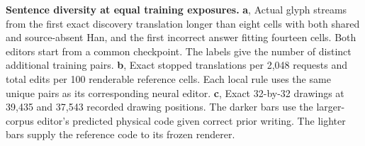 \textbf{Sentence diversity at equal training exposures.}
\textbf{a}, Actual glyph streams from the first exact discovery translation longer than eight cells with both shared and source-absent Han, and the first incorrect answer fitting fourteen cells. Both editors start from a common checkpoint. The labels give the number of distinct additional training pairs.
\textbf{b}, Exact stopped translations per 2,048 requests and total edits per 100 renderable reference cells. Each local rule uses the same unique pairs as its corresponding neural editor.
\textbf{c}, Exact 32-by-32 drawings at 39,435 and 37,543 recorded drawing positions. The darker bars use the larger-corpus editor's predicted physical code given correct prior writing. The lighter bars supply the reference code to its frozen renderer.
